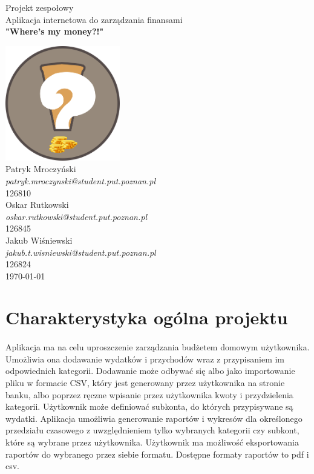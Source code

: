 \documentclass{article}
\begin{document}
	
		\begin{titlepage}
		\centering
		
		 \Huge{
		 	\indexspace Projekt zespołowy \\ 
		 	\indexspace Aplikacja internetowa do zarządzania finansami \\[1cm]
		 	\indexspace \textbf{"Where's my money?!"\\[1cm]}}
		
		\includegraphics[width=5cm]{assets/logo.png}\\[1cm]
		\Large{Patryk Mroczyński \\ \textlangle{}\textit{patryk.mroczynski@student.put.poznan.pl}\textrangle{} \\126810\\
		Oskar Rutkowski \\ \textlangle{}\textit{oskar.rutkowski@student.put.poznan.pl}\textrangle{} \\126845 \\
		Jakub Wiśniewski \\ \textlangle{}\textit{jakub.t.wisniewski@student.put.poznan.pl}\textrangle{} \\126824 \\[0.5cm]}
	\today
		
	\end{titlepage}
	\newpage
	\tableofcontents
	\newpage

	\section{Charakterystyka ogólna projektu}
	\paragraph{} Aplikacja ma na celu uproszczenie zarządzania budżetem domowym użytkownika. Umożliwia ona dodawanie wydatków i przychodów wraz z przypisaniem im odpowiednich kategorii. Dodawanie może odbywać się albo jako importowanie pliku w formacie CSV, który jest generowany przez użytkownika na stronie banku, albo poprzez ręczne wpisanie przez użytkownika kwoty i przydzielenia kategorii. Użytkownik może definiować subkonta, do których przypisywane są wydatki. Aplikacja umożliwia generowanie raportów i wykresów dla określonego przedziału czasowego z uwzględnieniem tylko wybranych kategorii czy subkont, które są wybrane przez użytkownika. Użytkownik ma możliwość eksportowania raportów do wybranego przez siebie formatu. Dostępne formaty raportów to pdf i csv.
\end{document}
